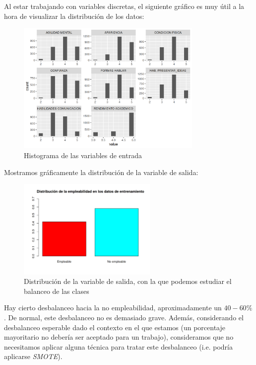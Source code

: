 \documentclass[11pt]{article}
\begin{document}
Al estar trabajando con variables discretas, el siguiente gráfico es muy útil a la hora de visualizar la distribución de los datos:

\begin{figure}[H]
    \centering
    \includegraphics[width=0.8\textwidth]{histogramas_variables}
    \caption{Histograma de las variables de entrada}
\end{figure}

Mostramos gráficamente la distribución de la variable de salida:

\begin{figure}[H]
    \centering
    \includegraphics[width=0.6\textwidth]{balanceo_clases}
    \caption{Distribución de la variable de salida, con la que podemos estudiar el balanceo de las clases}
\end{figure}


Hay cierto desbalanceo hacia la no empleabilidad, aproximadamente un $40-60\%$. De normal, este desbalanceo no es demasiado grave. Además, considerando el desbalanceo esperable dado el contexto en el que estamos (un porcentaje mayoritario no debería ser aceptado para un trabajo), consideramos que no necesitamos aplicar alguna técnica para tratar este desbalanceo (i.e. podría aplicarse \textit{SMOTE}).
\end{document}
